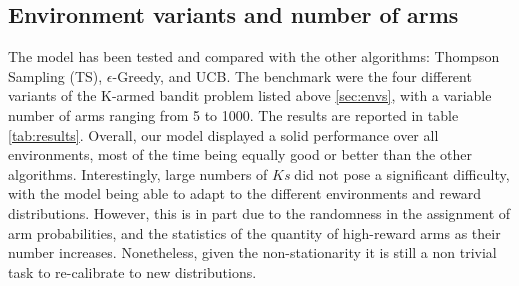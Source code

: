 \subsection{Environment variants and number of arms}

The model has been tested and compared with the other algorithms: Thompson Sampling (TS), $\epsilon$-Greedy, and UCB. The benchmark were the four different variants of the K-armed bandit problem listed above \ref{sec:envs}, with a variable number of arms ranging from 5 to 1000.
The results are reported in table \ref{tab:results}.
Overall, our model displayed a solid performance over all environments, most of the time being equally good or better than the other algorithms.
Interestingly, large numbers of $K$\textit{s} did not pose a significant difficulty, with the model being able to adapt to the different environments and reward distributions.
However, this is in part due to the randomness in the assignment of arm probabilities, and the statistics of the quantity of high-reward arms as their number increases. Nonetheless, given the non-stationarity it is still a non trivial task to re-calibrate to new distributions.


